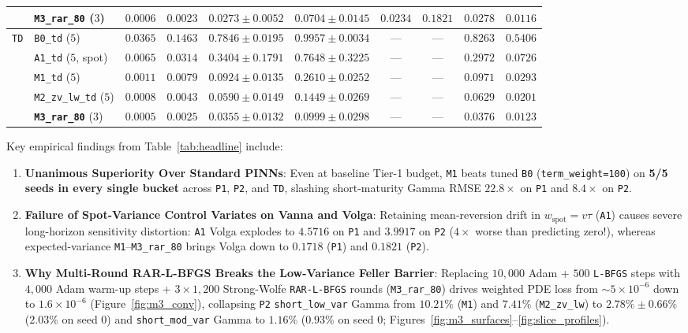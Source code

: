 \documentclass[11pt,a4paper]{article}
\begin{document}
\begin{table}[htbp]
{\begin{tabular}{llcccccccc}
 & \textbf{\texttt{M3\_rar\_80}} ($3$) & $\mathbf{0.0006}$ & $\mathbf{0.0023}$ & $\mathbf{0.0273 \pm 0.0052}$ & $\mathbf{0.0704 \pm 0.0145}$ & $\mathbf{0.0234}$ & $\mathbf{0.1821}$ & $\mathbf{0.0278}$ & $\mathbf{0.0116}$ \\
\midrule
\multirow{5}{*}{\texttt{TD}}
 & \texttt{B0\_td} ($5$) & $0.0365$ & $0.1463$ & $0.7846 \pm 0.0195$ & $0.9957 \pm 0.0034$ & --- & --- & $0.8263$ & $0.5406$ \\
 & \texttt{A1\_td} ($5$, spot) & $0.0065$ & $0.0314$ & $0.3404 \pm 0.1791$ & $0.7648 \pm 0.3225$ & --- & --- & $0.2972$ & $0.0726$ \\
 & \texttt{M1\_td} ($5$) & $0.0011$ & $0.0079$ & $0.0924 \pm 0.0135$ & $0.2610 \pm 0.0252$ & --- & --- & $0.0971$ & $0.0293$ \\
 & \texttt{M2\_zv\_lw\_td} ($5$) & $0.0008$ & $0.0043$ & $0.0590 \pm 0.0149$ & $0.1449 \pm 0.0269$ & --- & --- & $0.0629$ & $0.0201$ \\
 & \textbf{\texttt{M3\_rar\_80}} ($3$) & $\mathbf{0.0005}$ & $\mathbf{0.0025}$ & $\mathbf{0.0355 \pm 0.0132}$ & $\mathbf{0.0999 \pm 0.0298}$ & --- & --- & $\mathbf{0.0376}$ & $\mathbf{0.0123}$ \\
\bottomrule
\end{tabular}}
\end{table}

Key empirical findings from Table~\ref{tab:headline} include:
\begin{enumerate}
  \item \textbf{Unanimous Superiority Over Standard PINNs}: Even at baseline Tier-1 budget, \texttt{M1} beats tuned \texttt{B0} (\texttt{term\_weight=100}) on \textbf{5/5 seeds in every single bucket} across \texttt{P1}, \texttt{P2}, and \texttt{TD}, slashing short-maturity Gamma RMSE $22.8\times$ on \texttt{P1} and $8.4\times$ on \texttt{P2}.
  \item \textbf{Failure of Spot-Variance Control Variates on Vanna and Volga}: Retaining mean-reversion drift in $w_{\mathrm{spot}} = v\tau$ (\texttt{A1}) causes severe long-horizon sensitivity distortion: \texttt{A1} Volga explodes to $4.5716$ on \texttt{P1} and $3.9917$ on \texttt{P2} ($4\times$ worse than predicting zero!), whereas expected-variance \texttt{M1}--\texttt{M3\_rar\_80} brings Volga down to $0.1718$ (\texttt{P1}) and $0.1821$ (\texttt{P2}).
  \item \textbf{Why Multi-Round RAR-L-BFGS Breaks the Low-Variance Feller Barrier}: Replacing $10{,}000$ Adam + $500$ \texttt{L-BFGS} steps with $4{,}000$ Adam warm-up steps + $3 \times 1{,}200$ Strong-Wolfe \texttt{RAR-L-BFGS} rounds (\texttt{M3\_rar\_80}) drives weighted PDE loss from $\sim 5 \times 10^{-6}$ down to $1.6 \times 10^{-6}$ (Figure~\ref{fig:m3_conv}), collapsing \texttt{P2} \texttt{short\_low\_var} Gamma from $10.21\%$ (\texttt{M1}) and $7.41\%$ (\texttt{M2\_zv\_lw}) to $\mathbf{2.78\% \pm 0.66\%}$ ($2.03\%$ on seed 0) and \texttt{short\_mod\_var} Gamma to $\mathbf{1.16\%}$ ($0.93\%$ on seed 0; Figures~\ref{fig:m3_surfaces}--\ref{fig:slice_profiles}).
\end{enumerate}
\end{document}

